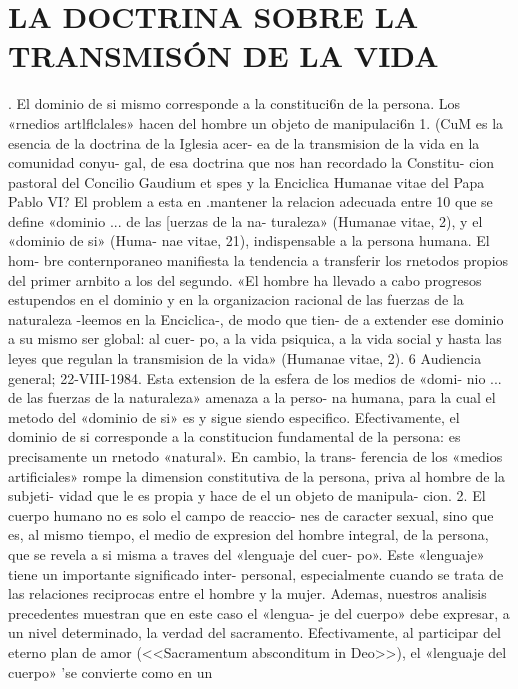 \documentclass[letterpaper]{report}
\begin{document}
	{\centering
		\section{LA DOCTRINA SOBRE LA TRANSMIS\'ON DE LA VIDA}
	}
	. El dominio de si mismo corresponde a la constituci6n 
de la persona. Los «rnedios artlflclales» hacen 
del hombre un objeto de manipulaci6n 
1. (CuM es la esencia de la doctrina de la Iglesia acer- 
ea de la transmision de la vida en la comunidad conyu- 
gal, de esa doctrina que nos han recordado la Constitu- 
cion pastoral del Concilio Gaudium et spes y la Enciclica 
Humanae vitae del Papa Pablo VI? 
El problem a esta en .mantener la relacion adecuada 
entre 10 que se define «dominio ... de las [uerzas de la na- 
turaleza» (Humanae vitae, 2), y el «dominio de si» (Huma- 
nae vitae, 21), indispensable a la persona humana. El hom- 
bre conternporaneo manifiesta la tendencia a transferir 
los rnetodos propios del primer arnbito a los del segundo. 
«El hombre ha llevado a cabo progresos estupendos en el 
dominio y en la organizacion racional de las fuerzas de la 
naturaleza -leemos en la Enciclica-, de modo que tien- 
de a extender ese dominio a su mismo ser global: al cuer- 
po, a la vida psiquica, a la vida social y hasta las leyes que 
regulan la transmision de la vida» (Humanae vitae, 2). 
6 Audiencia general; 22-VIII-1984. 
Esta extension de la esfera de los medios de «domi- 
nio ... de las fuerzas de la naturaleza» amenaza a la perso- 
na humana, para la cual el metodo del «dominio de si» es 
y sigue siendo especifico. Efectivamente, el dominio de si 
corresponde a la constitucion fundamental de la persona: 
es precisamente un rnetodo «natural». En cambio, la trans- 
ferencia de los «medios artificiales» rompe la dimension 
constitutiva de la persona, priva al hombre de la subjeti- 
vidad que le es propia y hace de el un objeto de manipula- 
cion. 
2. El cuerpo humano no es solo el campo de reaccio- 
nes de caracter sexual, sino que es, al mismo tiempo, el 
medio de expresion del hombre integral, de la persona, 
que se revela a si misma a traves del «lenguaje del cuer- 
po». Este «lenguaje» tiene un importante significado inter- 
personal, especialmente cuando se trata de las relaciones 
reciprocas entre el hombre y la mujer. Ademas, nuestros 
analisis precedentes muestran que en este caso el «lengua- 
je del cuerpo» debe expresar, a un nivel determinado, la 
verdad del sacramento. Efectivamente, al participar del 
eterno plan de amor (<<Sacramentum absconditum in 
Deo>>), el «lenguaje del cuerpo» 'se convierte como en un 
\end{document}
